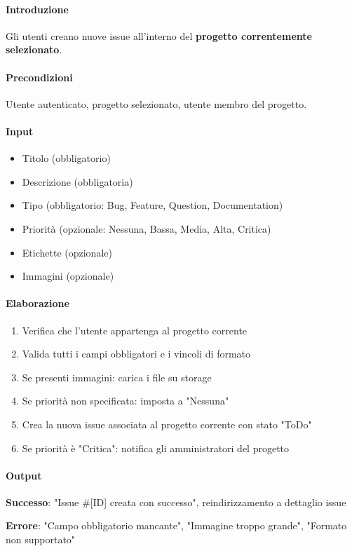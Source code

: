 \begin{reqbox}[title=REQ-FUN-09: Segnala Issue]
\label{subsubsec:req-segnala-issue}

\paragraph{Introduzione}
Gli utenti creano nuove issue all'interno del \textbf{progetto correntemente selezionato}.

\paragraph{Precondizioni}
Utente autenticato, progetto selezionato, utente membro del progetto.

\paragraph{Input}
\begin{itemize}[leftmargin=1.1em]
\item Titolo (obbligatorio)
\item Descrizione (obbligatoria)
\item Tipo (obbligatorio: Bug, Feature, Question, Documentation)
\item Priorità (opzionale: Nessuna, Bassa, Media, Alta, Critica)
\item Etichette (opzionale)
\item Immagini (opzionale)
\end{itemize}

\paragraph{Elaborazione}
\begin{enumerate}[leftmargin=1.1em]
\item Verifica che l'utente appartenga al progetto corrente
\item Valida tutti i campi obbligatori e i vincoli di formato
\item Se presenti immagini: carica i file su storage
\item Se priorità non specificata: imposta a "Nessuna"
\item Crea la nuova issue associata al progetto corrente con stato "ToDo"
\item Se priorità è "Critica": notifica gli amministratori del progetto
\end{enumerate}

\paragraph{Output}
\textbf{Successo}: "Issue \#[ID] creata con successo", reindirizzamento a dettaglio issue

\textbf{Errore}: "Campo obbligatorio mancante", "Immagine troppo grande", "Formato non supportato"

\end{reqbox}

